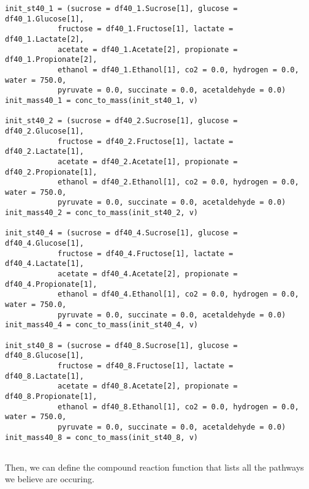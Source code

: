 \documentclass[11pt]{article}
\begin{document}
\begin{verbatim}
init_st40_1 = (sucrose = df40_1.Sucrose[1], glucose = df40_1.Glucose[1],
            fructose = df40_1.Fructose[1], lactate = df40_1.Lactate[2],
            acetate = df40_1.Acetate[2], propionate = df40_1.Propionate[2],
            ethanol = df40_1.Ethanol[1], co2 = 0.0, hydrogen = 0.0, water = 750.0,
            pyruvate = 0.0, succinate = 0.0, acetaldehyde = 0.0)
init_mass40_1 = conc_to_mass(init_st40_1, v)

init_st40_2 = (sucrose = df40_2.Sucrose[1], glucose = df40_2.Glucose[1],
            fructose = df40_2.Fructose[1], lactate = df40_2.Lactate[1],
            acetate = df40_2.Acetate[1], propionate = df40_2.Propionate[1],
            ethanol = df40_2.Ethanol[1], co2 = 0.0, hydrogen = 0.0, water = 750.0,
            pyruvate = 0.0, succinate = 0.0, acetaldehyde = 0.0)
init_mass40_2 = conc_to_mass(init_st40_2, v)

init_st40_4 = (sucrose = df40_4.Sucrose[1], glucose = df40_4.Glucose[1],
            fructose = df40_4.Fructose[1], lactate = df40_4.Lactate[1],
            acetate = df40_4.Acetate[2], propionate = df40_4.Propionate[1],
            ethanol = df40_4.Ethanol[1], co2 = 0.0, hydrogen = 0.0, water = 750.0,
            pyruvate = 0.0, succinate = 0.0, acetaldehyde = 0.0)
init_mass40_4 = conc_to_mass(init_st40_4, v)

init_st40_8 = (sucrose = df40_8.Sucrose[1], glucose = df40_8.Glucose[1],
            fructose = df40_8.Fructose[1], lactate = df40_8.Lactate[1],
            acetate = df40_8.Acetate[2], propionate = df40_8.Propionate[1],
            ethanol = df40_8.Ethanol[1], co2 = 0.0, hydrogen = 0.0, water = 750.0,
            pyruvate = 0.0, succinate = 0.0, acetaldehyde = 0.0)
init_mass40_8 = conc_to_mass(init_st40_8, v)


\end{verbatim}

Then, we can define the compound reaction function that lists all the pathways we believe are occuring.
\end{document}
